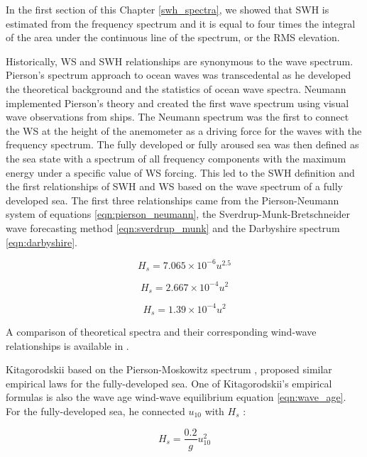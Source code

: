 In the first section of this Chapter \ref{swh_spectra}, we showed that SWH is estimated from the frequency spectrum and it is equal to four times the integral of the area under the continuous line of the spectrum, or the RMS elevation.

Historically, WS and SWH relationships are synonymous to the wave spectrum. Pierson's spectrum approach to ocean waves \cite{Pierson1955} was transcedental as he developed the theoretical background and the statistics of ocean wave spectra. Neumann implemented Pierson's theory and created the first wave spectrum using visual wave observations from ships. The Neumann spectrum was the first to connect the WS at the height of the anemometer as a driving force for the waves with the frequency spectrum. The fully developed or fully aroused sea was then defined as the sea state with a spectrum of all frequency components with the maximum energy under a specific value of WS forcing. This led to the SWH definition and the first relationships of SWH and WS based on the wave spectrum of a fully developed sea. The first three relationships came from the Pierson-Neumann system of equations \ref{eqn:pierson_neumann}, the  Sverdrup-Munk-Bretschneider wave forecasting method \ref{eqn:sverdrup_munk} and the Darbyshire spectrum \ref{eqn:darbyshire}. 

\begin{equation}
H_{s} = 7.065 \times 10^{-6} u^{2.5}
\label{eqn:pierson_neumann}
\end{equation}

\begin{equation}
H_{s} = 2.667 \times 10^{-4} u^{2}
\label{eqn:sverdrup_munk}
\end{equation}

\begin{equation}
H_{s} = 1.39 \times 10^{-4} u^{2}
\label{eqn:darbyshire}
\end{equation}

A comparison of theoretical spectra and their corresponding wind-wave relationships is available in \cite{Neumann1957}.

Kitagorodskii based on the Pierson-Moskowitz spectrum \cite{Pierson1964}, proposed similar empirical laws for the fully-developed sea. One of Kitagorodskii's empirical formulas is also the wave age wind-wave equilibrium equation \ref{eqn:wave_age}. For the fully-developed sea, he connected $u_{10}$ with $H_{s}$ \cite{CsanadyASI2001}:

\begin{equation}
H_{s} = \frac{0.2}{g} u_{10}^{2}
\label{eqn:kitagorodskii}
\end{equation}

